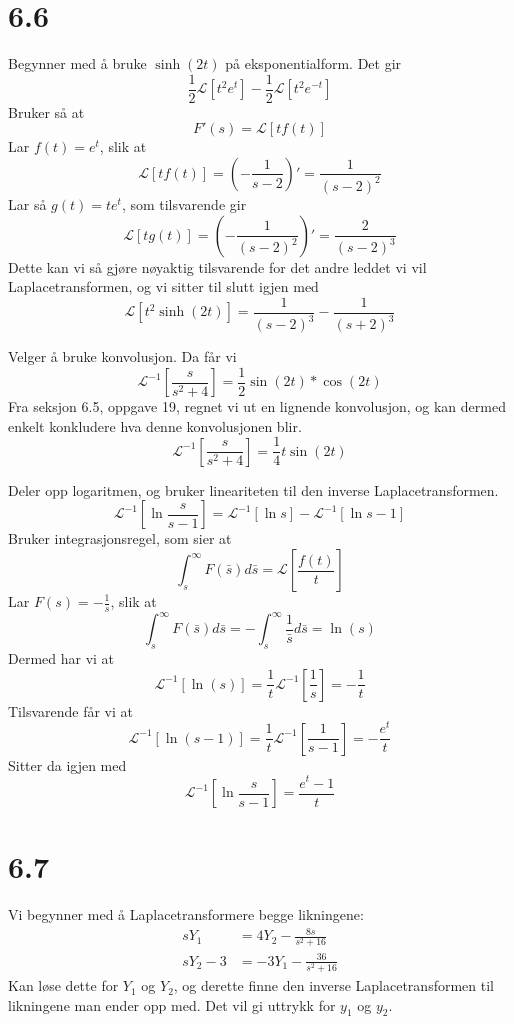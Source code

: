 \documentclass[11pt, a4paper, norsk]{NTNUoving}
\begin{document}
\section*{6.6}
\begin{oppgave}[7]
  Begynner med å bruke $\sinh(2t)$ på eksponentialform. Det gir
  \[
    \frac{1}{2}\mathscr{L}[t^{2}e^{t}]-\frac{1}{2}\mathscr{L}[t^{2}e^{-t}]
  \]
  Bruker så at
  \[
    F'(s)= \mathscr{L}[tf(t)]
  \]
  Lar $f(t)=e^{t}$, slik at
  \[
    \mathscr{L}[tf(t)]=\left(-\frac{1}{s-2}\right)'=\frac{1}{(s-2)^{2}}
  \]
  Lar så $g(t)=te^{t}$, som tilsvarende gir
  \[
    \mathscr{L}[tg(t)]=\left(-\frac{1}{(s-2)^{2}}\right)'=\frac{2}{(s-2)^{3}}
  \]
  Dette kan vi så gjøre nøyaktig tilsvarende for det andre leddet vi vil Laplacetransformen, og vi sitter til slutt igjen med
  \[
    \mathscr{L}[t^{2}\sinh(2t)]=\frac{1}{(s-2)^{3}}-\frac{1}{(s+2)^{3}}
  \]
\end{oppgave}
\begin{oppgave}[15]
  Velger å bruke konvolusjon. Da får vi
  \[
    \mathscr{L}^{-1}\left[\frac{s}{s^{2}+4}\right]
    =\frac{1}{2}\sin(2t)*\cos(2t)
  \]
  Fra seksjon 6.5, oppgave 19, regnet vi ut en lignende konvolusjon, og kan dermed enkelt konkludere hva denne konvolusjonen blir.
  \[
    \mathscr{L}^{-1}\left[\frac{s}{s^{2}+4}\right]=\frac{1}{4}t\sin(2t)
  \]
\end{oppgave}
\begin{oppgave}[17]
  Deler opp logaritmen, og bruker lineariteten til den inverse Laplacetransformen.
  \[
    \mathscr{L}^{-1}\left[\ln\frac{s}{s-1}\right]
    = \mathscr{L}^{-1}[\ln s] - \mathscr{L}^{-1}[\ln s-1]
  \]
  Bruker integrasjonsregel, som sier at
  \[
    \int_{s}^{\infty}F(\bar{s})d\bar{s}=\mathscr{L}\left[\frac{f(t)}{t}\right]
  \]
  Lar $F(s)=-\frac{1}{s}$, slik at
  \[
    \int_{s}^{\infty}F(\bar{s})d\bar{s}
    =-\int_{s}^{\infty}\frac{1}{\bar{s}}d\bar{s}
    = \ln(s)
  \]
  Dermed har vi at
  \[
    \mathscr{L}^{-1}[\ln(s)]
    =\frac{1}{t}\mathscr{L}^{-1}\left[\frac{1}{s}\right]
    =-\frac{1}{t}
  \]
  Tilsvarende får vi at
  \[
    \mathscr{L}^{-1}[\ln(s-1)]
    =\frac{1}{t}\mathscr{L}^{-1}\left[\frac{1}{s-1}\right]
    =-\frac{e^{t}}{t}
  \]
  Sitter da igjen med
  \[
    \mathscr{L}^{-1}\left[\ln\frac{s}{s-1}\right]
    =\frac{e^{t}-1}{t}
  \]
\end{oppgave}
\section*{6.7}
\begin{oppgave}[4]
  Vi begynner med å Laplacetransformere begge likningene:
  \begin{align*}
    sY_{1} &= 4Y_{2}-\frac{8s}{s^{2}+16} \\
    sY_{2} -3 &= -3Y_{1}-\frac{36}{s^{2}+16}
  \end{align*}
  Kan løse dette for $Y_{1}$ og $Y_{2}$, og derette finne den inverse Laplacetransformen til likningene man ender opp med. Det vil gi uttrykk for $y_{1}$ og $y_{2}$.
\end{oppgave}
\end{document}
